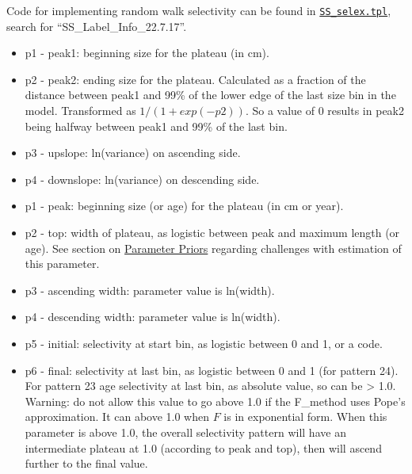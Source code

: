 Code for implementing random walk selectivity can be found in \href{https://github.com/nmfs-ost/ss3-source-code/blob/main/SS_selex.tpl}{\texttt{SS\_selex.tpl}}, search for ``SS\_Label\_Info\_22.7.17''.

\hypertarget{DoubleNormalPlateau}{}
	\begin{itemize}
		\item p1 - peak1: beginning size for the plateau (in cm).
		\item p2 - peak2: ending size for the plateau. Calculated as a fraction of the distance between peak1 and 99\% of the lower edge of the last size bin in the model. Transformed as $1/(1+exp(-p2))$. So a value of 0 results in peak2 being halfway between peak1 and 99\% of the last bin.
		\item p3 - upslope: ln(variance) on ascending side.
		\item p4 - downslope: ln(variance) on descending side.
	\end{itemize}

\hypertarget{DoubleNormalPeak}{}
	\begin{itemize}
		\item p1 - peak: beginning size (or age) for the plateau (in cm or year).
		\item p2 - top: width of plateau, as logistic between peak and maximum length (or age). See section on \hyperlink{PriorDescrip}{Parameter Priors} regarding challenges with estimation of this parameter.
		\item p3 - ascending width: parameter value is ln(width).
		\item p4 - descending width: parameter value is ln(width).
		\item p5 - initial: selectivity at start bin, as logistic between 0 and 1, or a code.
		\item p6 - final: selectivity at last bin, as logistic between 0 and 1 (for pattern 24). For pattern 23 age selectivity at last bin, as absolute value, so can be > 1.0. Warning: do not allow this value to go above 1.0 if the F\_method uses Pope's approximation. It can above 1.0 when $F$ is in exponential form. When this parameter is above 1.0, the overall selectivity pattern will have an intermediate plateau at 1.0 (according to peak and top), then will ascend further to the final value.
	\end{itemize}
	
